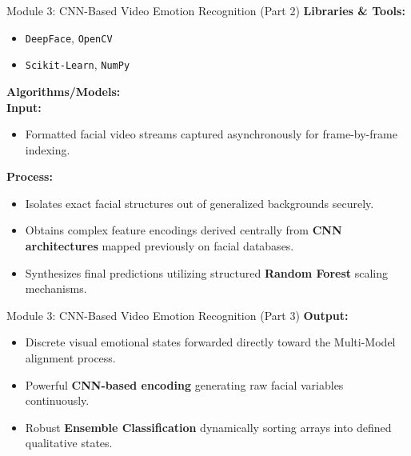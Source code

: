 \documentclass[11pt]{beamer}
\begin{document}
\begin{frame}{Module 3: CNN-Based Video Emotion Recognition (Part 2)}
\textbf{Libraries \& Tools:}
\begin{itemize}
    \item \texttt{DeepFace}, \texttt{OpenCV}
    \item \texttt{Scikit-Learn}, \texttt{NumPy}
\end{itemize}

\vspace{0.3cm}
\textbf{Algorithms/Models:}
\\
\textbf{Input:}
\begin{itemize}
    \item Formatted facial video streams captured asynchronously for frame-by-frame indexing.
\end{itemize}

\textbf{Process:}
\begin{itemize}
    \item Isolates exact facial structures out of generalized backgrounds securely.
    \item Obtains complex feature encodings derived centrally from \textbf{CNN architectures} mapped previously on facial databases.
    \item Synthesizes final predictions utilizing structured \textbf{Random Forest} scaling mechanisms.
\end{itemize}
\end{frame}
\begin{frame}{Module 3: CNN-Based Video Emotion Recognition (Part 3)}
\textbf{Output:}
\begin{itemize}
    \item Discrete visual emotional states forwarded directly toward the Multi-Model alignment process.
\end{itemize}
\begin{itemize}
    \item Powerful \textbf{CNN-based encoding} generating raw facial variables continuously.
    \item Robust \textbf{Ensemble Classification} dynamically sorting arrays into defined qualitative states.
\end{itemize}
\end{frame}
\end{document}
